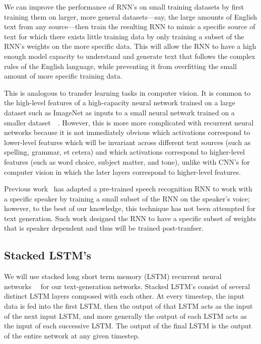 \documentclass[10pt,twocolumn,letterpaper]{article}
\begin{document}
	We can improve the performance of RNN's on small training datasets by first training them on larger, more general datasets---say, the large amounts of English text from any source---then train the resulting RNN to mimic a specific source of text for which there exists little training data by only training a subset of the RNN's weights on the more specific data. This will allow the RNN to have a high enough model capacity to understand and generate text that follows the complex rules of the English language, while preventing it from overfitting the small amount of more specific training data.
	
	This is analogous to transfer learning tasks in computer vision. It is common to the high-level features of a high-capacity neural network trained on a large dataset such as ImageNet as inputs to a small neural network trained on a smaller dataset~\cite{CNNOffTheShelf}~\cite{TransferableFeaturesNN}. However, this is more more complicated with recurrent neural networks because it is not immediately obvious which activations correspond to lower-level features which will be invariant across different text sources (such as spelling, grammar, et cetera) and which activations correspond to higher-level features (such as word choice, subject matter, and tone), unlike with CNN's for computer vision in which the later layers correspond to higher-level features.
	
	Previous work~\cite{SpeakerAdaptation} has adapted a pre-trained speech recognition RNN to work with a specific speaker by training a small subset of the RNN on the speaker's voice; however, to the best of our knowledge, this technique has not been attempted for text generation. Such work designed the RNN to have a specific subset of weights that is speaker dependent and thus will be trained post-tranfser.
	
	\subsection{Stacked LSTM's}
		We will use stacked long short term memory (LSTM) recurrent neural networks~\cite{LSTM}~\cite{graves2013generating} for our text-generation networks. Stacked LSTM's consist of several distinct LSTM layers composed with each other. At every timestep, the input data is fed into the first LSTM, then the output of that LSTM acts as the input of the next input LSTM, and more generally the output of each LSTM acts as the input of each successive LSTM. The output of the final LSTM is the output of the entire network at any given timestep.
		
\end{document}
